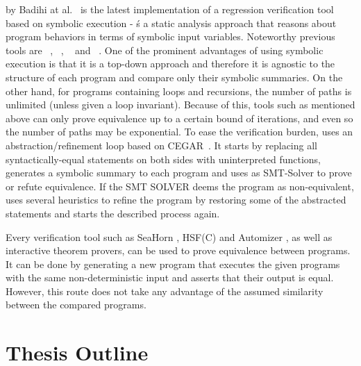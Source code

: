  by Badihi at al.~\cite{10.1145/3368089.3409757} is the latest implementation of a regression verification tool based on symbolic execution - ś a static analysis approach that reasons about program behaviors in terms of symbolic input variables. Noteworthy previous tools are ~\cite{10.1145/3238147.3238178}, ~\cite{10.1007/978-3-319-66706-5_20}, ~\cite{inproceedings} and ~\cite{10.1145/1453101.1453131}. One of the prominent advantages of using symbolic execution is that it is a top-down approach and therefore it is agnostic to the structure of each program and compare only their symbolic summaries. On the other hand, for programs containing loops and recursions, the number of paths is unlimited (unless given a loop invariant). Because of this, tools such as mentioned above can only prove equivalence up to a certain bound of iterations, and even so the number of paths may be exponential. To ease the verification burden,  uses an abstraction/refinement loop based on CEGAR~\cite{10.1007/10722167_15}. It starts by replacing all syntactically-equal statements on both sides with uninterpreted functions, generates a symbolic summary to each program and uses as SMT-Solver to prove or refute equivalence. If the SMT SOLVER deems the program as non-equivalent,  uses several heuristics to refine the program by restoring some of the abstracted statements and starts the described process again.


Every verification tool such as SeaHorn \cite{DBLP:conf/cav/GurfinkelKKN15}, HSF(C) \cite{DBLP:conf/tacas/GrebenshchikovGLPR12} and Automizer \cite{DBLP:conf/cav/HeizmannHP13}, as well as interactive theorem provers, can be used to prove equivalence between programs. It can be done by generating a new program that executes the given programs with the same non-deterministic input and asserts that their output is equal. However, this route does not take any advantage of the assumed similarity between the compared programs.

\section{Thesis Outline}
